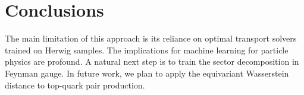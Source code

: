 \section{Conclusions}\label{sec:conclusions}

The main limitation of this approach is its reliance on optimal
transport solvers trained on Herwig samples. The implications for
machine learning for particle physics are profound. A natural next step
is to train the sector decomposition in Feynman gauge. In future work,
we plan to apply the equivariant Wasserstein distance to top-quark pair
production.

